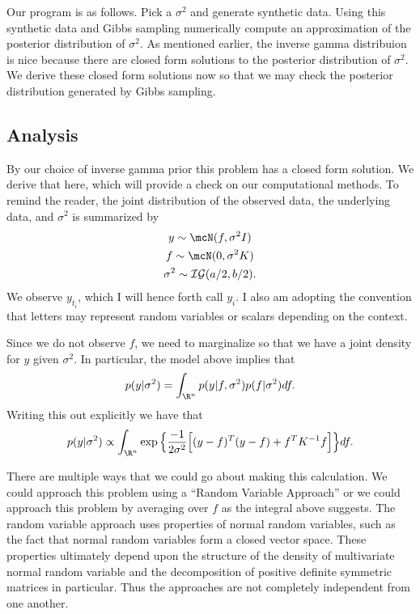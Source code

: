 \documentclass{report}
\begin{document}
Our program is as follows.  Pick a $\sigma^2$ and generate synthetic data.  Using this synthetic data and Gibbs sampling numerically compute an approximation of the posterior distribution of $\sigma^2$.  As mentioned earlier, the inverse gamma distribuion is nice because there are closed form solutions to the posterior distribution of $\sigma^2$.  We derive these closed form solutions now so that we may check the posterior distribution generated by Gibbs sampling.

\subsection{Analysis}

By our choice of inverse gamma prior this problem has a closed form solution.  We derive that here, which will provide a check on our computational methods.  To remind the reader, the joint distribution of the observed data, the underlying data, and $\sigma^2$ is summarized by
\begin{gather*}
y \sim \mcN(f, \sigma^2 I) \\
f \sim \mcN(0, \sigma^2 K) \\
\sigma^2 \sim \mathcal{IG}(a/2,b/2).
\end{gather*}
We observe $y_{t_i}$, which I will hence forth call $y_i$.  I also am adopting the convention that letters may represent random variables or scalars depending on the context.  

Since we do not observe $f$, we need to marginalize so that we have a joint density for $y$ given $\sigma^2$.  In particular, the model above implies that
\[
p(y | \sigma^2) = \int_{\R^n} p(y | f, \sigma^2) p(f | \sigma^2) df.
\]
Writing this out explicitly we have that
\[
p(y | \sigma^2) \propto \int_{\R^n} \exp \Big\{ \frac{-1}{2 \sigma^2} \Big[ (y-f)^T(y-f) + f^T K^{-1} f \Big] \Big\} df.
\]

There are multiple ways that we could go about making this calculation.  We could approach this problem using a ``Random Variable Approach'' or we could approach this problem by averaging over $f$ as the integral above suggests.  The random variable approach uses properties of normal random variables, such as the fact that normal random variables form a closed vector space.  These properties ultimately depend upon the structure of the density of multivariate normal random variable and the decomposition of positive definite symmetric matrices in particular.  Thus the approaches are not completely independent from one another.
\end{document}
